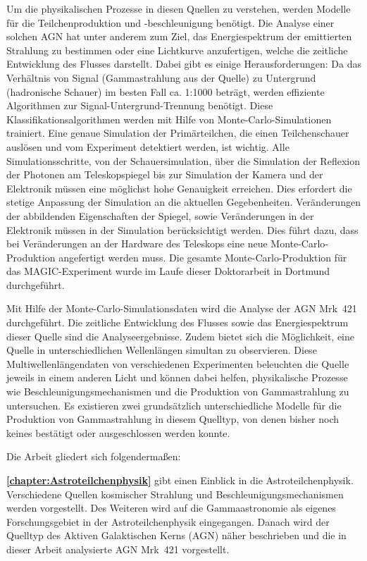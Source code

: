 Um die physikalischen Prozesse in diesen Quellen zu verstehen, werden Modelle für die Teilchenproduktion und -beschleunigung benötigt.
Die Analyse einer solchen AGN hat unter anderem zum Ziel, das Energiespektrum der emittierten Strahlung zu bestimmen oder eine Lichtkurve anzufertigen, welche die zeitliche Entwicklung des Flusses darstellt.
Dabei gibt es einige Herausforderungen:
Da das Verhältnis von Signal (Gammastrahlung aus der Quelle) zu Untergrund (hadronische Schauer) im besten Fall ca. 1:1000 beträgt, werden effiziente Algorithmen zur Signal-Untergrund-Trennung benötigt.
Diese Klassifikationsalgorithmen werden mit Hilfe von Monte-Carlo-Simulationen trainiert.
Eine genaue Simulation der Primärteilchen, die einen Teilchenschauer auslösen und vom Experiment detektiert werden, ist wichtig.
Alle Simulationsschritte, von der Schauersimulation, über die Simulation der Reflexion der Photonen am Teleskopspiegel bis zur Simulation der Kamera und der Elektronik müssen eine möglichst hohe Genauigkeit erreichen.
Dies erfordert die stetige Anpassung der Simulation an die aktuellen Gegebenheiten.
Veränderungen der abbildenden Eigenschaften der Spiegel, sowie Veränderungen in der Elektronik müssen in der Simulation berücksichtigt werden.
Dies führt dazu, dass bei Veränderungen an der Hardware des Teleskops eine neue Monte-Carlo-Produktion angefertigt werden muss.
Die gesamte Monte-Carlo-Produktion für das MAGIC-Experiment wurde im Laufe dieser Doktorarbeit in Dortmund durchgeführt.

Mit Hilfe der Monte-Carlo-Simulationsdaten wird die Analyse der AGN Mrk~421 durchgeführt.
Die zeitliche Entwicklung des Flusses sowie das Energiespektrum dieser Quelle sind die Analyseergebnisse.
Zudem bietet sich die Möglichkeit, eine Quelle in unterschiedlichen Wellenlängen simultan zu observieren.
Diese Multiwellenlängendaten von verschiedenen Experimenten beleuchten die Quelle jeweils in einem anderen Licht und können dabei helfen, physikalische Prozesse wie Beschleunigungsmechanismen und die Produktion von Gammastrahlung zu untersuchen.
Es existieren zwei grundsätzlich unterschiedliche Modelle für die Produktion von Gammastrahlung in diesem Quelltyp, von denen bisher noch keines bestätigt oder ausgeschlossen werden konnte.\newline

Die Arbeit gliedert sich folgendermaßen:

\textbf{\autoref{chapter:Astroteilchenphysik}} gibt einen Einblick in die Astroteilchenphysik. 
Verschiedene Quellen kosmischer Strahlung und Beschleunigungsmechanismen werden vorgestellt. 
Des Weiteren wird auf die Gammaastronomie als eigenes Forschungsgebiet in der Astroteilchenphysik eingegangen. 
Danach wird der Quelltyp des Aktiven Galaktischen Kerns (AGN) näher beschrieben und die in dieser Arbeit analysierte AGN Mrk~421 vorgestellt.

